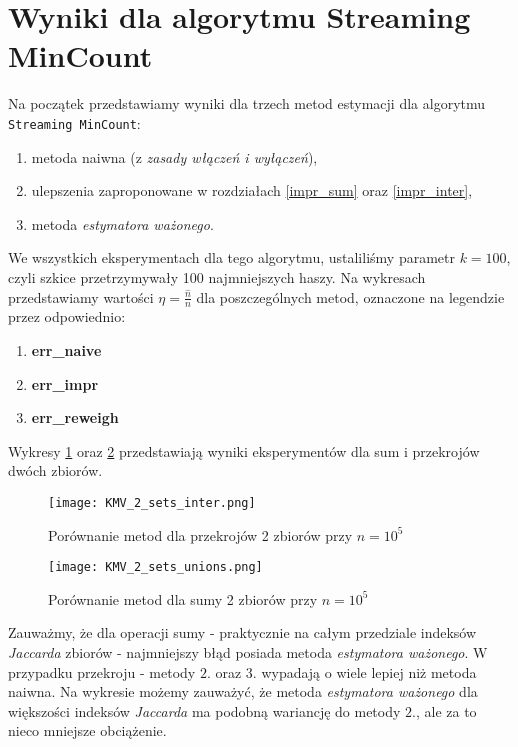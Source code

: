 \section{Wyniki dla algorytmu Streaming MinCount}
Na początek przedstawiamy wyniki dla trzech metod estymacji dla algorytmu \texttt{Streaming MinCount}:
\begin{enumerate}
	\item metoda naiwna (z \textit{zasady włączeń i wyłączeń}),
	\item ulepszenia zaproponowane w rozdziałach \ref{impr_sum} oraz \ref{impr_inter},
	\item metoda \textit{estymatora ważonego}.
\end{enumerate}
We wszystkich eksperymentach dla tego algorytmu, ustaliliśmy parametr $k = 100$, czyli szkice przetrzymywały 100 najmniejszych haszy.
Na wykresach przedstawiamy wartości $\eta = \frac{\hat{n}}{n}$ dla poszczególnych metod, oznaczone na legendzie przez odpowiednio:
\begin{enumerate}
	\item \textbf{err\_naive}
	\item \textbf{err\_impr}
	\item \textbf{err\_reweigh}
\end{enumerate}
Wykresy \ref{fig:KMV_2sets_inter} oraz \ref{fig:KMV_2sets_unions} przedstawiają wyniki eksperymentów dla sum i przekrojów dwóch zbiorów.

\begin{figure}[h!]
    \texttt{[image: KMV\_2\_sets\_inter.png]}
    \centering
    \caption{Porównanie metod dla przekrojów 2 zbiorów przy $n=10^5$}
    \label{fig:KMV_2sets_inter}
\end{figure}

\begin{figure}[h!]
    \texttt{[image: KMV\_2\_sets\_unions.png]}
    \centering
    \caption{Porównanie metod dla sumy 2 zbiorów przy $n=10^5$}
    \label{fig:KMV_2sets_unions}
\end{figure}

Zauważmy, że dla operacji sumy - praktycznie na całym przedziale indeksów \textit{Jaccarda} zbiorów - najmniejszy błąd posiada metoda \textit{estymatora ważonego}. W przypadku przekroju - metody $2.$ oraz $3.$ wypadają o wiele lepiej niż metoda naiwna. Na wykresie możemy zauważyć, że metoda \textit{estymatora ważonego} dla większości indeksów \textit{Jaccarda} ma podobną wariancję do metody $2.$, ale za to nieco mniejsze obciążenie.

